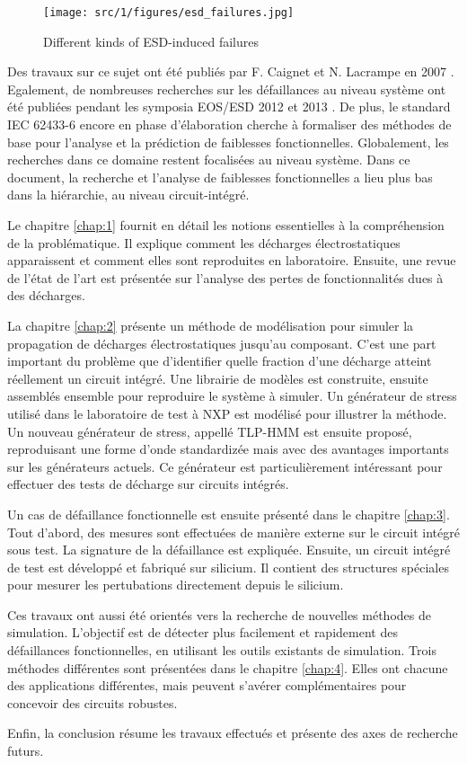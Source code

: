 \begin{figure}[!h]
  \centering
  \texttt{[image: src/1/figures/esd\_failures.jpg]}
  \caption{Different kinds of ESD-induced failures}
  \label{fig:esd-failures}
\end{figure}

Des travaux sur ce sujet ont été publiés par F. Caignet et N. Lacrampe en 2007 \cite{}.
Egalement, de nombreuses recherches sur les défaillances au niveau système ont été publiées pendant les symposia EOS/ESD 2012 \cite{} et 2013 \cite{}.
De plus, le standard IEC 62433-6 encore en phase d'élaboration cherche à formaliser des méthodes de base pour l'analyse et la prédiction de faiblesses fonctionnelles.
Globalement, les recherches dans ce domaine restent focalisées au niveau système.
Dans ce document, la recherche et l'analyse de faiblesses fonctionnelles a lieu plus bas dans la hiérarchie, au niveau circuit-intégré.

%
Le chapitre \ref{chap:1} fournit en détail les notions essentielles à la compréhension de la problématique.
Il explique comment les décharges électrostatiques apparaissent et comment elles sont reproduites en laboratoire.
Ensuite, une revue de l'état de l'art est présentée sur l'analyse des pertes de fonctionnalités dues à des décharges.

%
La chapitre \ref{chap:2} présente un méthode de modélisation pour simuler la propagation de décharges électrostatiques jusqu'au composant.
C'est une part important du problème que d'identifier quelle fraction d'une décharge atteint réellement un circuit intégré.
Une librairie de modèles est construite, ensuite assemblés ensemble pour reproduire le système à simuler.
Un générateur de stress utilisé dans le laboratoire de test à NXP est modélisé pour illustrer la méthode.
Un nouveau générateur de stress, appellé TLP-HMM est ensuite proposé, reproduisant une forme d'onde standardizée mais avec des avantages importants sur les générateurs actuels.
Ce générateur est particulièrement intéressant pour effectuer des tests de décharge sur circuits intégrés.

%
Un cas de défaillance fonctionnelle est ensuite présenté dans le chapitre \ref{chap:3}.
Tout d'abord, des mesures sont effectuées de manière externe sur le circuit intégré sous test.
La signature de la défaillance est expliquée.
Ensuite, un circuit intégré de test est développé et fabriqué sur silicium.
Il contient des structures spéciales pour mesurer les pertubations directement depuis le silicium.

%
Ces travaux ont aussi été orientés vers la recherche de nouvelles méthodes de simulation.
L'objectif est de détecter plus facilement et rapidement des défaillances fonctionnelles, en utilisant les outils existants de simulation.
Trois méthodes différentes sont présentées dans le chapitre \ref{chap:4}.
Elles ont chacune des applications différentes, mais peuvent s'avérer complémentaires pour concevoir des circuits robustes.

%
Enfin, la conclusion résume les travaux effectués et présente des axes de recherche futurs.
